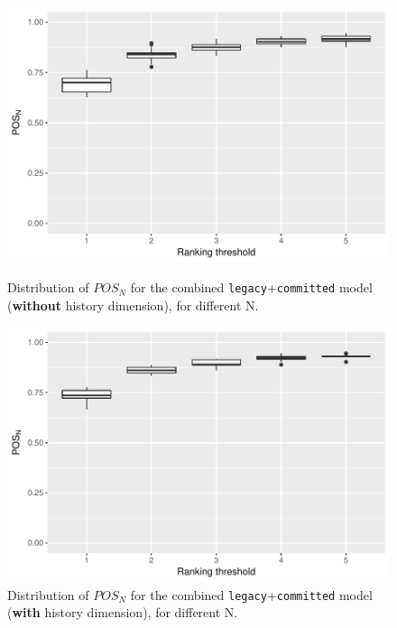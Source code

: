 \begin{figure}[t]
  \centering
  \begin{minipage}[b]{\columnwidth}
    \centering
    \includegraphics[scale=.5]{plots/RQ3_curr}
    \caption{Distribution of $POS_N$ for the combined \texttt{legacy}+\texttt{committed} model (\textbf{without} history dimension), for different N.}
    \label{fig:rq3_curr}
  \end{minipage}
  \begin{minipage}[b]{\columnwidth}
    \centering
    \includegraphics[scale=.5]{plots/RQ3_hist}
    \caption{Distribution of $POS_N$ for the combined \texttt{legacy}+\texttt{committed} model (\textbf{with} history dimension), for different N.}
    \label{fig:rq3_hist}
  \end{minipage}
\end{figure}

